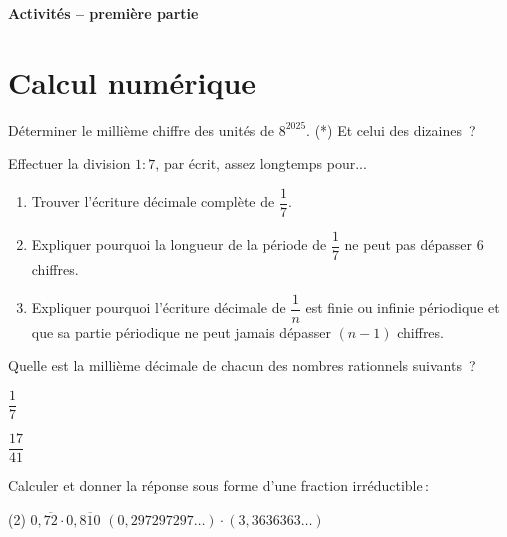 \documentclass[a4paper,12pt]{article}
\begin{document}
\setlength{\cftbeforesecskip}{2pt}

\setlength{\cftsecindent}{1em}
\begin{center}
{\bfseries \Huge Activités -- première partie}
\vspace{1cm}


\end{center}\vspace{-1cm}
\tableofcontents
\newpage
\clearpage
\setcounter{page}{1}
\section{Calcul numérique}
\begin{activite}
	\tcblower
	Déterminer le millième chiffre des unités de $8^{2025}$. 
	(*) Et celui des dizaines~?
\end{activite}
\begin{activite}
	\tcblower
	Effectuer la division $1:7$, par écrit, assez longtemps pour...
\begin{enumerate}
\item Trouver l'écriture décimale complète de $\dfrac{1}{7}$.
\item Expliquer pourquoi la longueur de la période de $\dfrac{1}{7}$ ne peut pas dépasser 6 chiffres.
\item Expliquer pourquoi l'écriture décimale de $\dfrac{1}{n}$ est finie ou infinie périodique et que sa partie périodique ne peut jamais dépasser $(n-1)$ chiffres.
\end{enumerate}
\end{activite}
\begin{activite}
	\tcblower
Quelle est la millième décimale de chacun des nombres rationnels suivants~?
\begin{inlineumerate}
\item $\dfrac{1}{7}$
\item $\dfrac{17}{41}$
\end{inlineumerate}
\end{activite}

\begin{activite}
	\tcblower
Calculer et donner la réponse sous forme d'une fraction irréductible\,:
\begin{tasks}(2)
\task $0, \overline{72} \cdot 0, \overline{810}$
\task $(0,297297297 \ldots) \cdot(3,3636363 \ldots)$
\end{tasks}
\end{activite}
\end{document}
